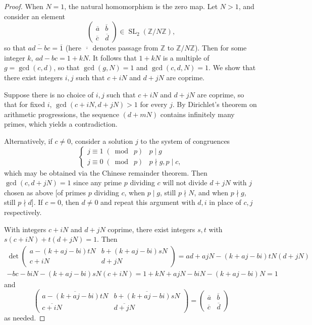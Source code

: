 \documentclass[10pt,leqno]{article}
\DeclareMathOperator{\SL}{SL}
\newcommand{\smod}[1]{\;(\bmod\; #1)}
\begin{document}
\begin{proof}
    When $N = 1$, the natural homomorphism is the zero map. Let $N>1$, and consider an element \[\begin{pmatrix}
        \overline a & \overline b \\ \overline c & \overline d
    \end{pmatrix}\in \SL_2(\mathbb{Z}/N\mathbb{Z}),\] so that $\overline{ad-bc} = \overline 1$ (here $\overline{\,\cdot\,}$ denotes passage from $\mathbb{Z}$ to $\mathbb{Z}/N\mathbb{Z}$). Then for some integer $k$, $ad-bc = 1+kN$. It follows that $1+kN$ is a multiple of $g = \gcd(c,d)$, so that $\gcd(g,N)=1$ and $\gcd(c,d,N)=1$. We show that there exist integers $i,j$ such that $c+iN$ and $d+jN$ are coprime.
    
    Suppose there is no choice of $i,j$ such that $c+iN$ and $d+jN$ are coprime, so that for fixed $i$, $\gcd(c+iN,d+jN)>1$ for every $j$. By Dirichlet's theorem on arithmetic progressions, the sequence $(d+mN)$ contains infinitely many primes, which yields a contradiction.
    
    Alternatively, if $c\neq 0$, consider a solution $j$ to the system of congruences 
    \[\begin{cases}
        j\equiv 1\smod{p} & p\mid g\\
        j\equiv 0\smod{p} & p\nmid g, p\mid c,
    \end{cases}\] which may be obtained via the Chinese remainder theorem. Then $\gcd(c,d+jN) = 1$ since any prime $p$ dividing $c$ will not divide $d+jN$ with $j$ chosen as above [of primes $p$ dividing $c$, when $p\mid g$, still $p\nmid N$, and when $p\nmid g$, still $p\nmid d$]. If $c = 0$, then $d\neq 0$ and repeat this argument with $d,i$ in place of $c,j$ respectively.

    With integers $c+iN$ and $d+jN$ coprime, there exist integers $s,t$ with $s(c+iN) + t(d+jN) = 1$. Then \begin{multline*}
        \det\begin{pmatrix}
            a-(k+aj-bi)tN & b+(k+aj-bi)sN \\ c+iN & d+jN
        \end{pmatrix} = ad+ajN-(k+aj-bi)tN(d+jN)\\-bc-biN-(k+aj-bi)sN(c+iN) = 1+kN+ajN-biN-(k+aj-bi)N = 1
    \end{multline*} and 
    \[\begin{pmatrix}
        \overline{a-(k+aj-bi)tN} & \overline{b+(k+aj-bi)sN} \\ \overline{c+iN} & \overline{d+jN}
    \end{pmatrix} = \begin{pmatrix}
        \overline a & \overline b \\ \overline c & \overline d
    \end{pmatrix}\] as needed.
\end{proof}
\end{document}
